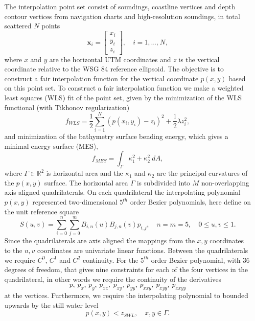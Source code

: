 \documentclass[A4paper,11pt]{marine_2023_Paper}
\newcommand{\V}[1]{\boldsymbol{#1}}
\begin{document}
The interpolation point set consist of soundings, coastline vertices and depth contour vertices from navigation charts and high-resolution soundings, in total scattered $N$ points
\begin{equation}
\V{x}_i = 	 \left[ \begin{matrix}
	 	x_i \\ y_i \\ z_i
	 \end{matrix} \right], \quad i=1,\ldots,N,
 \label{eq_points}
\end{equation}
where $x$ and $y$ are the horizontal UTM coordinates and $z$ is the vertical coordinate relative to the WSG 84 reference ellipsoid. The objective is to construct a fair interpolation function for the vertical coordinate $p(x,y)$ based on this point set. To construct a fair interpolation function we make a weighted least squares (WLS) fit of the point set, given by the minimization of the WLS functional (with Tikhonov regularization)
\begin{equation}
	f_{WLS} = \frac{1}{2}\sum_{i=1}^N \left(p(x_i,y_i)- z_i \right)^2 + \frac{1}{2}\lambda z_i^2 ,
\end{equation}
and minimization of the bathymetry surface bending energy, which gives a minimal energy surface (MES),
\begin{equation}
	f_{MES} = \int_{\Gamma} \kappa_1^2 + \kappa_2^2 ~dA,
\end{equation}
where $\Gamma \in \mathbb{R}^2$ is horizontal area and the $\kappa_1$ and $\kappa_2$ are the principal curvatures of the $p(x,y)$ surface. The horizontal area $\Gamma$ is subdivided into $M$ non-overlapping axis aligned quadrilaterals. On each quadrilateral the interpolating polynomial $p(x,y)$ represented two-dimensional $5^{th}$ order Bezier polynomials, here define on the unit reference square
\begin{equation}
	S(u,v) = \sum_{i=0}^n\sum_{j=0}^m B_{i,n}(u)B_{j,n}(v) p_{i,j}, \quad n=m=5, \quad 0 \leq u,v \leq 1.
\end{equation}
Since the quadrilaterals are axis aligned the mappings from the $x,y$ coordinates to the $u,v$ coordinates are univariate linear functions. Between the quadrilaterals we require $C^0$, $C^1$ and $C^2$ continuity. For the $5^{th}$ order Bezier polynomial, with $36$ degrees of freedom, that gives nine constraints for each of the four vertices in the quadrilateral, in other words we require the continuity of the derivatives
\begin{equation}
	p,~p_x,~p_y,~p_{xx},~p_{xy},~p_{yy},~p_{xxy},~p_{xyy},~p_{xxyy}
\end{equation}
at the vertices. Furthermore, we require the interpolating polynomial to bounded upwards by the still water level 
\begin{equation}
	p(x,y)< z_{SWL}, \quad x,y \in \Gamma.
\end{equation}
\end{document}
